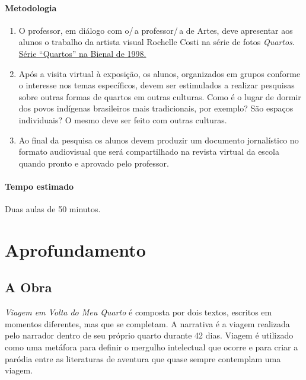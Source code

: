 \documentclass[12pt]{extarticle}
\begin{document}
\paragraph{Metodologia}
\begin{enumerate}
	\item
	O professor, em diálogo com o/\,a professor/\,a de Artes, deve apresentar aos alunos o trabalho da artista visual Rochelle Costi
	na série de fotos \emph{Quartos}. \href{http://www.24bienal.org.br/bra/ebraentcost01.htm}{Série ``Quartos'' na Bienal de 1998.}
	\item
	Após a visita virtual à exposição, os alunos, organizados em grupos conforme o interesse
	nos temas específicos, devem ser estimulados a realizar pesquisas
	sobre outras formas de quartos em outras culturas. Como é o lugar de dormir 
	dos povos indígenas brasileiros mais tradicionais, por exemplo? São espaços individuais?
	O mesmo deve ser feito com outras culturas.

	\item
	Ao final da pesquisa os alunos devem produzir um documento jornalístico no formato
	audiovisual que será compartilhado na revista virtual da escola quando pronto e 
	aprovado pelo professor.

\end{enumerate}

\paragraph{Tempo estimado} Duas aulas de 50 minutos.


\section{Aprofundamento}

\subsection{A Obra}




\emph{Viagem em Volta do Meu Quarto} é composta por dois textos, escritos em momentos diferentes, mas que se
completam. A narrativa é a viagem realizada pelo narrador dentro de seu
próprio quarto durante 42 dias. Viagem é utilizado como uma metáfora
para definir o mergulho intelectual que ocorre e para criar a paródia
entre as literaturas de aventura que quase sempre contemplam uma viagem.
\end{document}
